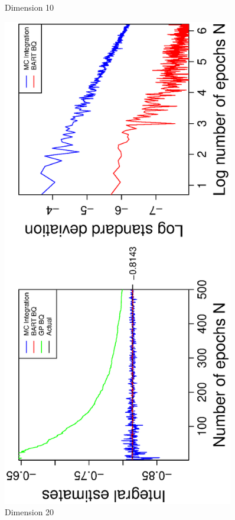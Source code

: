 \begin{figure}[H]
\begin{minipage}[b]{0.4\textwidth}
     \vspace{-1cm}
     \caption{Dimension 10}
  \end{minipage}
    \hspace{1.5cm}
  \begin{minipage}[b]{0.4\textwidth}
    \includegraphics[width= 0.9\textwidth, angle = -90]{report/Figures/5/convergenceMean520Dimensions.eps}
    \vspace{-1cm}
    \caption{Dimension 20}
  \end{minipage}
\end{figure}



